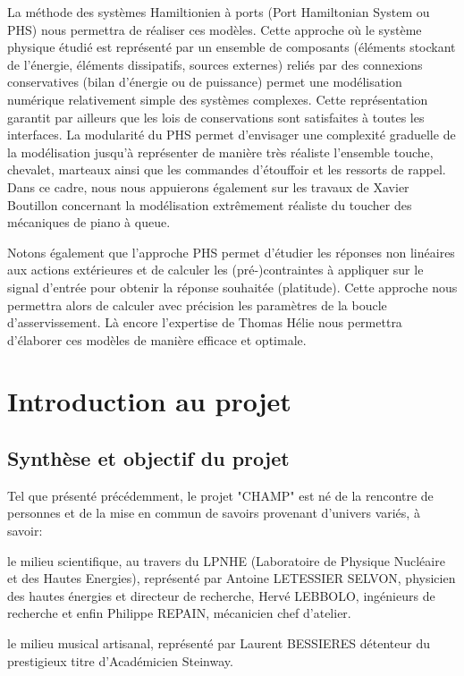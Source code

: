 \documentclass[french,a4paper,12pt]{report}
\begin{document}
La méthode des systèmes Hamiltionien à ports (Port Hamiltonian System ou PHS) nous permettra de réaliser ces modèles. Cette approche où le système physique étudié est représenté par un ensemble de composants (éléments stockant de l’énergie, éléments dissipatifs, sources externes) reliés par des connexions conservatives (bilan d’énergie ou de puissance) permet une modélisation numérique relativement simple des systèmes complexes. Cette représentation garantit par ailleurs que les lois de conservations sont satisfaites à toutes les interfaces. La modularité du PHS permet d’envisager une complexité graduelle de la modélisation jusqu’à représenter de manière très réaliste l’ensemble touche, chevalet, marteaux ainsi que les commandes d’étouffoir et les ressorts de rappel. Dans ce cadre, nous nous appuierons également sur les travaux de Xavier Boutillon concernant la modélisation extrêmement réaliste du toucher des mécaniques de piano à queue.

Notons également que l’approche PHS permet d’étudier les réponses non linéaires aux actions extérieures et de calculer les (pré-)contraintes à appliquer sur le signal d’entrée pour obtenir la réponse souhaitée (platitude). Cette approche nous permettra alors de calculer avec précision les paramètres de la boucle d’asservissement. Là encore l’expertise de Thomas Hélie nous permettra d’élaborer ces modèles de manière efficace et optimale.

	\chapter{Introduction au projet}
	
	\section{Synthèse et objectif du projet}
	
	Tel que présenté précédemment, le projet "CHAMP" est né de la rencontre de personnes et de la mise en commun de savoirs provenant d'univers variés, à savoir: 
	
	le milieu scientifique, au travers du LPNHE (Laboratoire de Physique Nucléaire et des Hautes Energies), représenté par Antoine LETESSIER SELVON, physicien des hautes énergies et directeur de recherche, Hervé LEBBOLO, ingénieurs de recherche et enfin Philippe REPAIN, mécanicien chef d'atelier.
	
	le milieu musical artisanal, représenté par Laurent BESSIERES détenteur du prestigieux titre d'Académicien Steinway. 
	
\end{document}
